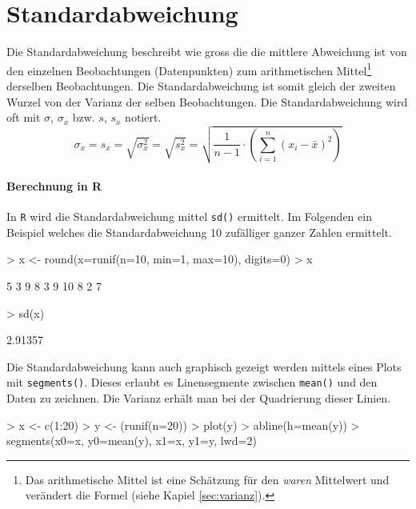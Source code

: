 \section{Standardabweichung}
Die \gls{Standardabweichung} beschreibt wie gross die die mittlere 
Abweichung ist von den einzelnen Beobachtungen (Datenpunkten) zum 
arithmetischen Mittel\footnote{Das arithmetische Mittel ist eine 
Schätzung für den
\emph{waren} Mittelwert und verändert die Formel 
(siehe Kapiel \ref{sec:varianz}).} 
derselben Beobachtungen. Die Standardabweichung ist somit gleich
der zweiten Wurzel von der Varianz der selben Beobachtungen. Die
Standardabweichung wird oft mit $\sigma$, $\sigma_x$ bzw. $s$, $s_x$ 
notiert.
\[
	\sigma_x 
	= s_x 
	= \sqrt{\sigma_{x}^2}
	= \sqrt{s_{x}^2}
	= \sqrt{\frac{1}{n-1} \cdot \left(
		\sum_{i=1}^n (x_i-\bar{x})^2 
	\right)}
\]

\paragraph{Berechnung in R}
In \lstinline{R} wird die Standardabweichung mittel \lstinline{sd()}
ermittelt. Im Folgenden ein Beispiel welches die Standardabweichung
10 zufälliger ganzer Zahlen ermittelt.
\begin{Schunk}
\begin{Sinput}
> x <- round(x=runif(n=10, min=1, max=10), digits=0)
> x
\end{Sinput}
\begin{Soutput}
 [1]  5  3  9  8  3  9 10  8  2  7
\end{Soutput}
\begin{Sinput}
> sd(x)
\end{Sinput}
\begin{Soutput}
[1] 2.91357
\end{Soutput}
\end{Schunk}
Die Standardabweichung kann auch graphisch gezeigt werden mittels
eines Plots mit \lstinline{segments()}. Dieses erlaubt es Linensegmente
zwischen \lstinline{mean()} und den Daten zu zeichnen. Die Varianz
erhält man bei der Quadrierung dieser Linien.
\begin{Schunk}
\begin{Sinput}
> x <- c(1:20)
> y <- (runif(n=20))
> plot(y)
> abline(h=mean(y))
> segments(x0=x, y0=mean(y), x1=x, y1=y, lwd=2)
\end{Sinput}
\end{Schunk}


